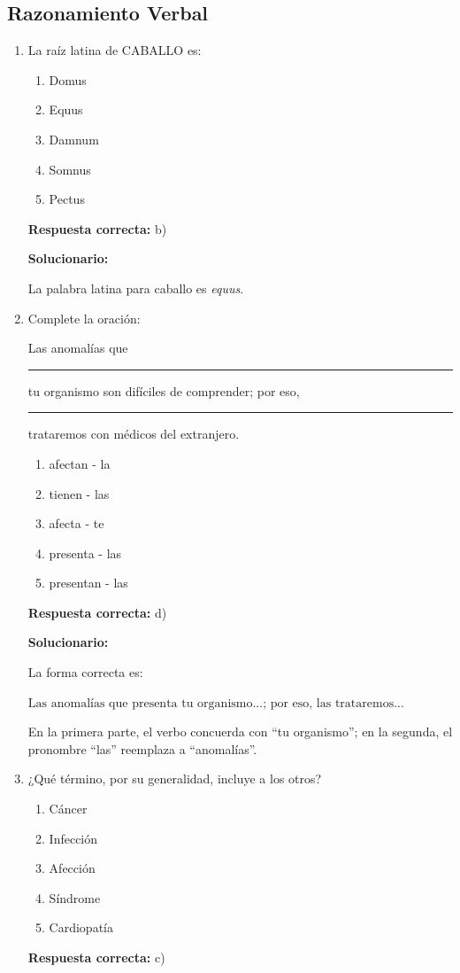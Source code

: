 \subsection*{Razonamiento Verbal}

\begin{enumerate}[resume]
	
	\item La raíz latina de CABALLO es:
	\begin{enumerate}[label=\alph*)]
		\item Domus
		\item Equus
		\item Damnum
		\item Somnus
		\item Pectus
	\end{enumerate}
	\textbf{Respuesta correcta:} b)
	
	\vspace{2mm}
	\textbf{Solucionario:}
	
	La palabra latina para caballo es \textit{equus}.
	
	\vspace{6mm}
	
	\item Complete la oración:
	
	Las anomalías que \rule{2cm}{0.15mm} tu organismo son difíciles de comprender; por eso, \rule{2cm}{0.15mm} trataremos con médicos del extranjero.
	\begin{enumerate}[label=\alph*)]
		\item afectan - la
		\item tienen - las
		\item afecta - te
		\item presenta - las
		\item presentan - las
	\end{enumerate}
	\textbf{Respuesta correcta:} d)
	
	\vspace{2mm}
	\textbf{Solucionario:}
	
	La forma correcta es:
	
	$\text{Las anomalías que presenta tu organismo...; por eso, las trataremos...}$
	
	En la primera parte, el verbo concuerda con “tu organismo”; en la segunda, el pronombre “las” reemplaza a “anomalías”.
	
	\vspace{6mm}
	
	\item ¿Qué término, por su generalidad, incluye a los otros?
	\begin{enumerate}[label=\alph*)]
		\item Cáncer
		\item Infección
		\item Afección
		\item Síndrome
		\item Cardiopatía
	\end{enumerate}
	\textbf{Respuesta correcta:} c)
	

\end{enumerate}
